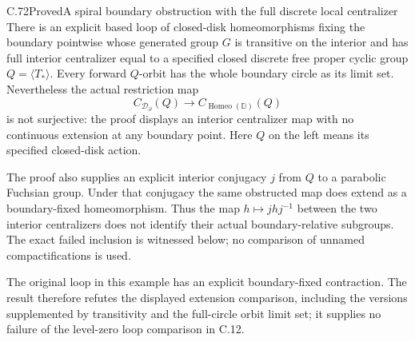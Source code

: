\begin{claim}{C.72}{Proved}{A spiral boundary obstruction with the full discrete local centralizer}
There is an explicit based loop of closed-disk homeomorphisms
fixing the boundary pointwise whose generated group $G$ is
transitive on the interior and has full interior centralizer
equal to a specified closed discrete free proper cyclic group
$Q=\langle T_*\rangle$. Every forward $Q$-orbit has the whole
boundary circle as its limit set. Nevertheless the actual
restriction map
\[
 C_{\mathcal D_\partial}(Q)\longrightarrow
              C_{\operatorname{Homeo}(\mathbb D)}(Q)
                                                               \tag{C.72.1}
\]
is not surjective: the proof displays an interior centralizer
map with no continuous extension at any boundary point.
Here $Q$ on the left means its specified closed-disk action.

The proof also supplies an explicit interior conjugacy
$j$ from $Q$ to a parabolic Fuchsian group. Under that
conjugacy the same obstructed map does extend as a
boundary-fixed homeomorphism. Thus the map
$h\mapsto jhj^{-1}$ between the two interior centralizers
does not identify their actual boundary-relative subgroups.
The exact failed inclusion is witnessed below; no
comparison of unnamed compactifications is used.

The original loop in this example has an explicit
boundary-fixed contraction. The result therefore
refutes the displayed extension comparison, including
the versions supplemented by transitivity and the
full-circle orbit limit set; it supplies no failure of
the level-zero loop comparison in C.12.
\end{claim}

